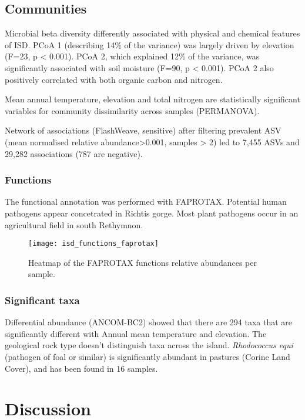 \subsection{Communities}\label{communities}
Microbial beta diversity differently associated with physical and chemical
features of ISD. PCoA 1 (describing 14\% of the variance) was largely driven by
elevation (F=23, p < 0.001). PCoA 2, which explained 12\% of the variance,
was significantly associated with soil moisture (F=90, p < 0.001).
PCoA 2 also positively correlated with both organic carbon and nitrogen.

Mean annual temperature, elevation and total nitrogen are statistically significant variables for
community dissimilarity across samples (PERMANOVA).

Network of associations (FlashWeave, sensitive) after filtering prevalent ASV (mean normalised relative
abundance>0.001, samples > 2) led to 7,455 ASVs and
29,282 associations (787 are negative).

\subsubsection{Functions}\label{functions}
The functional annotation was performed with FAPROTAX. Potential human pathogens 
appear concetrated in Richtis gorge. Most plant pathogens occur in an agricultural 
field in south Rethymnon. 

\begin{figure}[t] 
    \centering\texttt{[image: isd\_functions\_faprotax]}
\caption{Heatmap of the FAPROTAX functions relative abundances per sample.}
    \label{fig:isd_functions_faprotax}
\end{figure}

\subsubsection{Significant taxa}\label{sig_taxa}
Differential abundance (ANCOM-BC2) showed that there are 294 taxa that are significantly different
with Annual mean temperature and elevation. The geological rock type doesn't distinguish taxa
across the island. \textit{Rhodococcus equi} (pathogen of foal or similar) is significantly abundant in
pastures (Corine Land Cover), and has been found in 16 samples.

\section{Discussion}\label{discussion}

